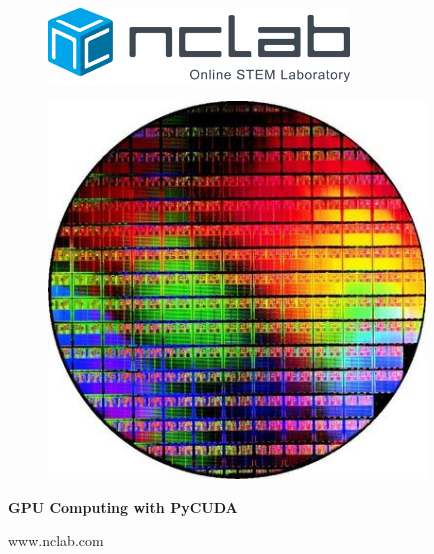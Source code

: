 \documentclass{article}
\begin{document}
\large

\vbox{}
\begin{figure}[!ht]
\includegraphics[width=8cm]{img/logo.png}
\vspace{16mm}
\end{figure}

\begin{figure}[!ht]
\begin{center}
\includegraphics[width=10cm]{img/cuda-frontpage.png}
\vspace{18mm}
\end{center}
\end{figure}

\centerline{\Huge \bf GPU Computing with PyCUDA}

\vfill

\centerline{\Large www.nclab.com}

\newpage




\section*{}
\small

\end{document}
